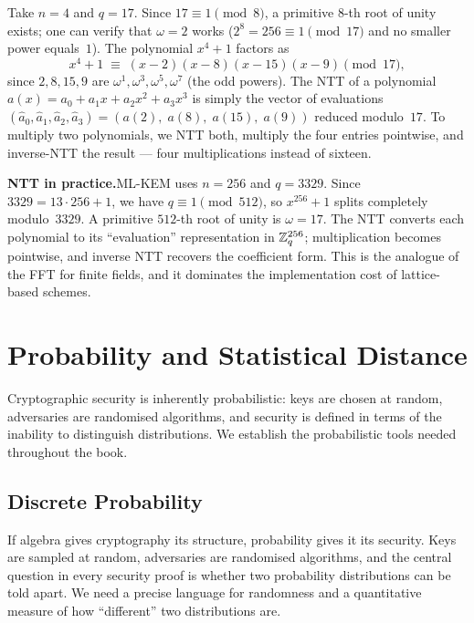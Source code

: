\begin{example}[NTT for $n = 4$, $q = 17$]
\label{ex:ntt-small}
Take $n = 4$ and $q = 17$.  Since $17 \equiv 1 \pmod{8}$, a primitive $8$-th root of unity exists; one can verify that $\omega = 2$ works ($2^8 = 256 \equiv 1 \pmod{17}$ and no smaller power equals~$1$).  The polynomial $x^4 + 1$ factors as
\[
x^4 + 1 \;\equiv\; (x - 2)(x - 8)(x - 15)(x - 9) \pmod{17},
\]
since $2, 8, 15, 9$ are $\omega^1, \omega^3, \omega^5, \omega^7$ (the odd powers).  The NTT of a polynomial $a(x) = a_0 + a_1 x + a_2 x^2 + a_3 x^3$ is simply the vector of evaluations $(\hat{a}_0, \hat{a}_1, \hat{a}_2, \hat{a}_3) = (a(2),\; a(8),\; a(15),\; a(9))$ reduced modulo~$17$.  To multiply two polynomials, we NTT both, multiply the four entries pointwise, and inverse-NTT the result --- four multiplications instead of sixteen.
\end{example}

\begin{svgraybox}
\textbf{NTT in practice.}\enspace ML-KEM uses $n = 256$ and $q = 3329$.  Since $3329 = 13 \cdot 256 + 1$, we have $q \equiv 1 \pmod{512}$, so $x^{256} + 1$ splits completely modulo~$3329$.  A primitive $512$-th root of unity is $\omega = 17$.  The NTT converts each polynomial to its ``evaluation'' representation in $\mathbb{Z}_q^{256}$; multiplication becomes pointwise, and inverse NTT recovers the coefficient form.  This is the analogue of the FFT for finite fields, and it dominates the implementation cost of lattice-based schemes.
\end{svgraybox}


\section{Probability and Statistical Distance}
\label{sec:probability}

Cryptographic security is inherently probabilistic: keys are chosen at random, adversaries are randomised algorithms, and security is defined in terms of the inability to distinguish distributions.  We establish the probabilistic tools needed throughout the book.

\subsection{Discrete Probability}
\label{subsec:discrete-prob}

If algebra gives cryptography its structure, probability gives it its security.  Keys are sampled at random, adversaries are randomised algorithms, and the central question in every security proof is whether two probability distributions can be told apart.  We need a precise language for randomness and a quantitative measure of how ``different'' two distributions are.

